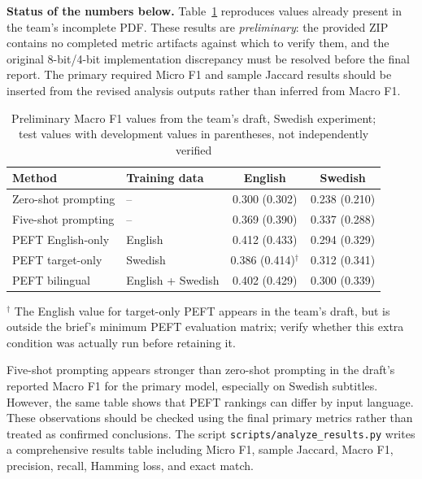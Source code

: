 \documentclass[11pt,a4paper]{article}
\begin{document}
\textbf{Status of the numbers below.} Table~\ref{tab:prelim} reproduces values already present in the team's incomplete PDF. These results are \emph{preliminary}: the provided ZIP contains no completed metric artifacts against which to verify them, and the original 8-bit/4-bit implementation discrepancy must be resolved before the final report. The primary required Micro F1 and sample Jaccard results should be inserted from the revised analysis outputs rather than inferred from Macro F1.

\begin{table}[H]
\centering\small
\caption{Preliminary Macro F1 values from the team's draft, Swedish experiment; test values with development values in parentheses, not independently verified}
\label{tab:prelim}
\begin{tabular}{llcc}
\toprule
Method & Training data & English & Swedish \\
\midrule
Zero-shot prompting & -- & 0.300 (0.302) & 0.238 (0.210) \\
Five-shot prompting & -- & 0.369 (0.390) & 0.337 (0.288) \\
\midrule
PEFT English-only & English & 0.412 (0.433) & 0.294 (0.329) \\
PEFT target-only & Swedish & 0.386 (0.414)$^\dagger$ & 0.312 (0.341) \\
PEFT bilingual & English + Swedish & 0.402 (0.429) & 0.300 (0.339) \\
\bottomrule
\end{tabular}
\vspace{2pt}
\begin{minipage}{0.95\linewidth}\footnotesize
$^\dagger$ The English value for target-only PEFT appears in the team's draft, but is outside the brief's minimum PEFT evaluation matrix; verify whether this extra condition was actually run before retaining it.
\end{minipage}
\end{table}

Five-shot prompting appears stronger than zero-shot prompting in the draft's reported Macro F1 for the primary model, especially on Swedish subtitles. However, the same table shows that PEFT rankings can differ by input language. These observations should be checked using the final primary metrics rather than treated as confirmed conclusions. The script \texttt{scripts/analyze\_results.py} writes a comprehensive results table including Micro F1, sample Jaccard, Macro F1, precision, recall, Hamming loss, and exact match.
\end{document}
